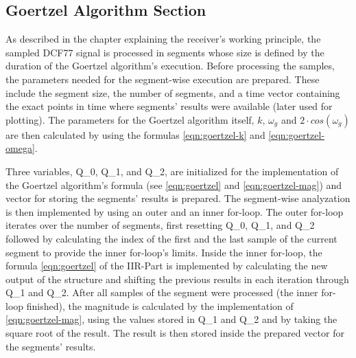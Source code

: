 \documentclass[conference]{IEEEtran}
\begin{document}
\subsection{Goertzel Algorithm Section}
As described in the chapter explaining the receiver's working principle, the sampled DCF77 signal is processed in segments whose size is defined by the duration of the Goertzel algorithm's execution.
Before processing the samples, the parameters needed for the segment-wise execution are prepared.
These include the segment size, the number of segments, and a time vector containing the exact points in time where segments' results were available (later used for plotting).
The parameters for the Goertzel algorithm itself, $k$, $\omega_{g}$ and $2 \cdot cos(\omega_{g})$ are then calculated by using the formulas \eqref{eqn:goertzel-k} and \eqref{eqn:goertzel-omega}.
\par
Three variables, Q\_0, Q\_1, and Q\_2, are initialized for the implementation of the Goertzel algorithm's formula (see \eqref{eqn:goertzel} and \eqref{eqn:goertzel-mag}) and vector for storing the segments' results is prepared.
The segment-wise analyzation is then implemented by using an outer and an inner for-loop.
The outer for-loop iterates over the number of segments, first resetting Q\_0, Q\_1, and Q\_2 followed by calculating the index of the first and the last sample of the current segment to provide the inner for-loop's limits.
Inside the inner for-loop, the formula \eqref{eqn:goertzel} of the IIR-Part is implemented by calculating the new output of the structure and shifting the previous results in each iteration through Q\_1 and Q\_2.
After all samples of the segment were processed (the inner for-loop finished), the magnitude is calculated by the implementation of \eqref{eqn:goertzel-mag}, using the values stored in Q\_1 and Q\_2 and by taking the square root of the result.
The result is then stored inside the prepared vector for the segments' results.
\end{document}
